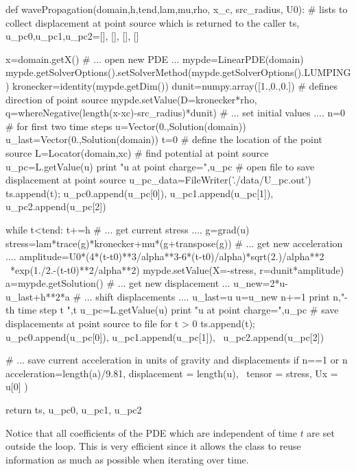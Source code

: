 \begin{python}
def wavePropagation(domain,h,tend,lam,mu,rho, x_c, src_radius, U0):
   # lists to collect displacement at point source which is returned to the caller
   ts, u_pc0,u_pc1,u_pc2=[], [], [], []
  
   x=domain.getX()
   # ... open new PDE ...
   mypde=LinearPDE(domain)
   mypde.getSolverOptions().setSolverMethod(mypde.getSolverOptions().LUMPING)
   kronecker=identity(mypde.getDim())
   dunit=numpy.array([1.,0.,0.]) # defines direction of point source
   mypde.setValue(D=kronecker*rho, q=whereNegative(length(x-xc)-src_radius)*dunit)
   # ... set initial values ....
   n=0
   # for first two time steps
   u=Vector(0.,Solution(domain))
   u_last=Vector(0.,Solution(domain))
   t=0
   # define the location of the point source 
   L=Locator(domain,xc)
   # find potential at point source
   u_pc=L.getValue(u)
   print "u at point charge=",u_pc
   # open file to save displacement at point source
   u_pc_data=FileWriter('./data/U_pc.out')
   ts.append(t); u_pc0.append(u_pc[0]), u_pc1.append(u_pc[1]), u_pc2.append(u_pc[2])

   while t<tend:
     t+=h
     # ... get current stress ....
     g=grad(u)
     stress=lam*trace(g)*kronecker+mu*(g+transpose(g))
     # ... get new acceleration ....
     amplitude=U0*(4*(t-t0)**3/alpha**3-6*(t-t0)/alpha)*sqrt(2.)/alpha**2 \
                                             *exp(1./2.-(t-t0)**2/alpha**2)
     mypde.setValue(X=-stress, r=dunit*amplitude)
     a=mypde.getSolution()
     # ... get new displacement ...
     u_new=2*u-u_last+h**2*a
     # ... shift displacements ....
     u_last=u
     u=u_new
     n+=1
     print n,"-th time step t ",t
     u_pc=L.getValue(u)
     print "u at point charge=",u_pc
     # save displacements at point source to file for t > 0
     ts.append(t); u_pc0.append(u_pc[0]), u_pc1.append(u_pc[1]), \
                                                    u_pc2.append(u_pc[2])

     # ... save current acceleration in units of gravity and displacements 
     if n==1 or n%
                                 acceleration=length(a)/9.81,
                                 displacement = length(u), \
				 tensor = stress, Ux = u[0] )

   return ts, u_pc0, u_pc1, u_pc2
\end{python}
Notice that 
all coefficients of the PDE which are independent of time $t$ are set outside the  
loop. This is very efficient since it allows the \LinearPDE class to reuse information as much as possible 
when iterating over time. 

